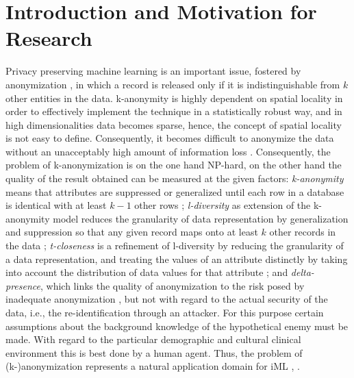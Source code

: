 \documentclass{llncs}
\begin{document}
\renewcommand{\thesubfigure}{\thefigure.\arabic{subfigure}}
\makeatletter
\renewcommand{\p@subfigure}{}
\renewcommand{\@thesubfigure}{\thesubfigure:\hskip\subfiglabelskip}
\makeatother

\section{Introduction and Motivation for Research}

Privacy preserving machine learning is an important issue, fostered by anonymization \cite{Samarati:2001:kAnonymity}, in which a record is released only if it is indistinguishable from $k$ other entities in the data. k-anonymity is highly dependent on spatial locality in order to effectively implement the technique in a statistically robust way, and in high dimensionalities data becomes sparse, hence, the concept of spatial locality is not easy to define. Consequently, it becomes difficult to anonymize the data without an unacceptably high amount of information loss \cite{Aggarwal:2005:kAnonymity}. Consequently, the problem of k-anonymization is on the one hand NP-hard, on the other hand the quality of the result obtained can be measured at the given factors: \emph{k-anonymity} means that attributes are suppressed or generalized until each row in a database is identical with at least $k-1$ other rows   \cite{Sweeney:2002:k-Anonymity}; \emph{l-diversity} as extension of the k-anonymity model reduces the granularity of data representation by generalization and suppression so that any given record maps onto at least $k$ other records in the data \cite{MachanavajjhalaEtAl:2007:l-Diversity}; \emph{t-closeness} is a refinement of l-diversity by reducing the granularity of a data representation, and treating the values of an attribute distinctly by taking into account the distribution of data values for that attribute \cite{LiEtAl:2007:t-closeness}; and \emph{delta-presence}, which links the quality of anonymization to the risk posed by inadequate anonymization \cite{NergizClifton:2010:Delta-Presence}, but not with regard to the actual security of the data, i.e., the re-identification through an attacker. For this purpose certain assumptions about the background knowledge of the hypothetical enemy must be made. With regard to the particular demographic and cultural clinical environment this is best done by a human agent. Thus, the problem of (k-)anonymization represents a natural application domain for iML \cite{Holzinger:2016:iML}, \cite{Kieseberg:2016:Doctor-in-the-Loop}.
\end{document}
